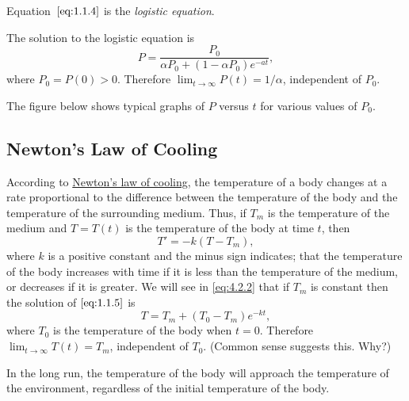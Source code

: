 \documentclass{ximera}
\begin{document}
Equation~$\eqref{eq:1.1.4}$ is  the \textit{logistic equation}.
 
 
The solution to the logistic equation is
$$
P=\frac{P_0}{\alpha P_0+(1-\alpha P_0)e^{-at}},
$$
where $P_0=P(0)>0$. Therefore
$\lim_{t\to\infty}P(t)=1/\alpha$, independent of $P_0$.
 
The figure below shows typical graphs of $P$ versus $t$ for
various values of  $P_0$.

\begin{center}
\end{center}
 

 
 
\subsection*{Newton's Law of Cooling}
 
According to
\href{https://en.wikipedia.org/wiki/Newton%27s_law_of_cooling}{Newton's law of cooling},  the temperature of a
body changes at a rate proportional to the difference between the
temperature of the body and the temperature of the surrounding medium.
 Thus, if  $T_m$ is the temperature of the
medium and
$T=T(t)$ is the temperature of the body at time $t$, then
\begin{equation} \label{eq:1.1.5}
T' = -k(T-T_m),
\end{equation}
where $k$ is a positive constant and the  minus sign indicates;   that
the temperature of the body increases with time if it is less than the
temperature of the medium, or decreases if it is greater. We will see in \eqref{eq:4.2.2} that if
$T_m$ is constant then the solution of $\eqref{eq:1.1.5}$ is
\begin{equation} \label{eq:1.1.6}
T=T_m+(T_0-T_m)e^{-kt},
\end{equation}
where $T_0$ is the temperature of the body when $t=0$.
Therefore $\lim_{t\to\infty}T(t)=T_m$, independent of $T_0$.
(Common sense suggests this. Why?)

\begin{solution}
In the long run, the temperature of the body will approach the temperature of the environment,  regardless of the initial temperature of the body.
\end{solution}
\end{document}
